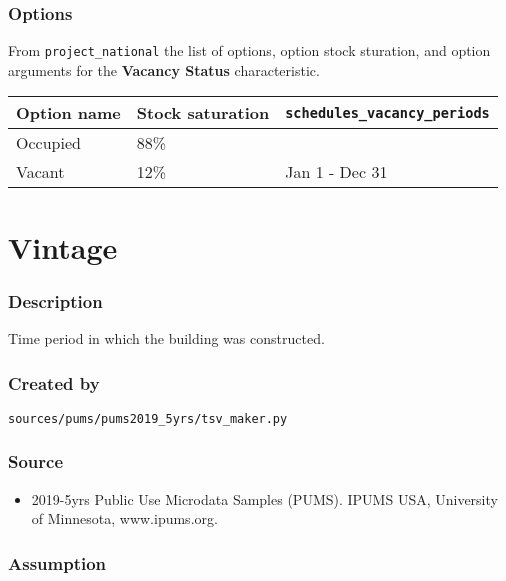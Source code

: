 \subsubsection{Options}\label{options-146}

From \texttt{project\_national} the list of options, option stock
sturation, and option arguments for the \textbf{Vacancy Status}
characteristic.

\begin{longtable}[]{@{}lll@{}}
\toprule\noalign{}
Option name & Stock saturation & \texttt{schedules\_vacancy\_periods} \\
\midrule\noalign{}
\endhead
\bottomrule\noalign{}
\endlastfoot
Occupied & 88\% & \\
Vacant & 12\% & Jan 1 - Dec 31 \\
\end{longtable}

\section{Vintage}\label{vintage}

\subsubsection{Description}\label{description-143}

Time period in which the building was constructed.

\subsubsection{Created by}\label{created-by-144}

\texttt{sources/pums/pums2019\_5yrs/tsv\_maker.py}

\subsubsection{Source}\label{source-146}

\begin{itemize}
 
\item
  2019-5yrs Public Use Microdata Samples (PUMS). IPUMS USA, University
  of Minnesota, www.ipums.org.
\end{itemize}

\subsubsection{Assumption}\label{assumption-82}

